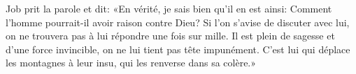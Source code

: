 Job prit la parole et dit: «En vérité, je sais bien qu’il en est ainsi:
	Comment l’homme pourrait-il avoir raison contre Dieu?
Si l’on s’avise de discuter avec lui,
	on ne trouvera pas à lui répondre une fois sur mille.
Il est plein de sagesse et d’une force invincible, on ne lui tient pas tête impunément.
C’est lui qui déplace les montagnes à leur insu, qui les renverse dans sa colère.»
